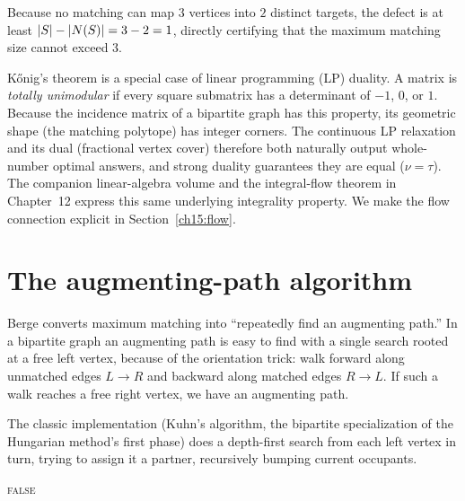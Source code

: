 Because no matching can map $3$ vertices into $2$ distinct targets, the defect is at least $\lvert S\rvert-\lvert N(S)\rvert=3-2=1$, directly certifying that the maximum matching size cannot exceed $3$.

\begin{connectionbox}
K\H{o}nig's theorem is a special case of linear programming (LP) duality. A matrix is \emph{totally unimodular} if every square submatrix has a determinant of $-1$, $0$, or $1$. Because the incidence matrix of a bipartite graph has this property, its geometric shape (the matching polytope) has integer corners. The continuous LP relaxation and its dual (fractional vertex cover) therefore both naturally output whole-number optimal answers, and strong duality guarantees they are equal ($\nu=\tau$). The companion linear-algebra volume and the integral-flow theorem in Chapter~12 express this same underlying integrality property. We make the flow connection explicit in Section~\ref{ch15:flow}.
\end{connectionbox}

\section{The augmenting-path algorithm}
\label{ch15:kuhn}

Berge converts maximum matching into ``repeatedly find an augmenting path.''
In a bipartite graph an augmenting path is easy to find with a single search
rooted at a free left vertex, because of the orientation trick: walk forward
along unmatched edges $L\to R$ and backward along matched edges $R\to L$. If such
a walk reaches a free right vertex, we have an augmenting path.

The classic implementation (Kuhn's algorithm, the bipartite specialization of
the Hungarian method's first phase) does a depth-first search from each left
vertex in turn, trying to assign it a partner, recursively bumping current
occupants.

\begin{algorithm}[H]
\caption{\textsc{Augment}$(u)$ -- try to match left vertex $u$ by DFS}
\label{ch15:alg-augment}
\DontPrintSemicolon
{}
\Return \textsc{false}\;
\end{algorithm}

